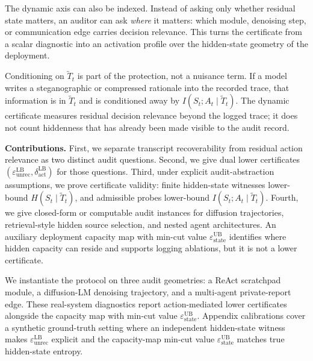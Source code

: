   The dynamic axis can also be indexed. Instead of asking only whether residual
  state matters, an auditor can ask \emph{where} it matters: which module,
  denoising step, or communication edge carries decision relevance. This turns
  the certificate from a scalar diagnostic into an activation profile over the
  hidden-state geometry of the deployment.

  Conditioning on $\tilde T_t$ is part of the protection, not a nuisance term.
  If a model writes a steganographic or compressed rationale into the recorded
  trace, that information is in $\tilde T_t$ and is conditioned away by $I(S_t;
  A_t \mid \tilde T_t)$. The dynamic certificate measures residual decision
  relevance beyond the logged trace; it does not count hiddenness that has
  already been made visible to the audit record.

  \textbf{Contributions.} First, we separate transcript recoverability from
  residual action relevance as two distinct audit questions. Second, we give
  dual lower certificates
  $(\varepsilon_\mathrm{unrec}^\mathrm{LB},
  \delta_\mathrm{act}^\mathrm{LB})$ for those questions. Third, under explicit
  audit-abstraction assumptions, we prove certificate validity: finite
  hidden-state witnesses lower-bound $H(S_t\mid\tilde T_t)$, and admissible
  probes lower-bound $I(S_t;A_t\mid\tilde T_t)$. Fourth, we give closed-form or
  computable audit instances for diffusion trajectories, retrieval-style hidden
  source selection, and nested agent architectures. An auxiliary deployment
  capacity map with min-cut value $\varepsilon_\text{state}^\text{UB}$
  identifies where hidden capacity can reside and supports logging ablations,
  but it is not a lower certificate.

  We instantiate the protocol on three audit geometries: a ReAct scratchpad
  module, a diffusion-LM denoising trajectory, and a multi-agent private-report
  edge. These real-system diagnostics report action-mediated lower certificates
  alongside the capacity map with min-cut value
  $\varepsilon_\text{state}^\text{UB}$.
  Appendix calibrations cover a synthetic ground-truth setting where an
  independent hidden-state witness makes
  $\varepsilon_\mathrm{unrec}^\mathrm{LB}$ explicit and the capacity-map
  min-cut value $\varepsilon_\text{state}^\text{UB}$ matches true hidden-state
  entropy.
